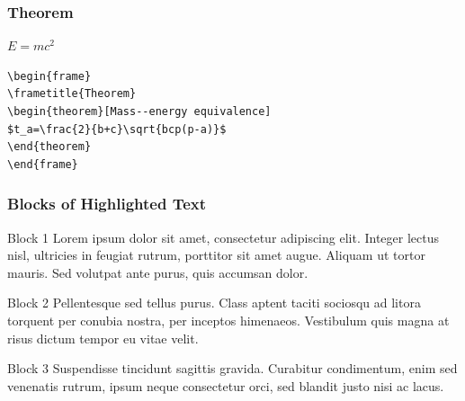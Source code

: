 \documentclass{beamer}
\begin{document}
\begin{frame}[fragile]

\frametitle{Theorem}
\begin{theorem}
$E = mc^2$
\end{theorem}

\begin{example}
\begin{verbatim}
\begin{frame}
\frametitle{Theorem}
\begin{theorem}[Mass--energy equivalence]
$t_a=\frac{2}{b+c}\sqrt{bcp(p-a)}$
\end{theorem}
\end{frame}\end{verbatim}
\end{example}


\end{frame}



\begin{frame}
\frametitle{Blocks of Highlighted Text}
\begin{block}{Block 1}
Lorem ipsum dolor sit amet, consectetur adipiscing elit. Integer lectus nisl, ultricies in feugiat rutrum, porttitor sit amet augue. Aliquam ut tortor mauris. Sed volutpat ante purus, quis accumsan dolor.
\end{block}

\begin{block}{Block 2}
Pellentesque sed tellus purus. Class aptent taciti sociosqu ad litora torquent per conubia nostra, per inceptos himenaeos. Vestibulum quis magna at risus dictum tempor eu vitae velit.
\end{block}

\begin{block}{Block 3}
Suspendisse tincidunt sagittis gravida. Curabitur condimentum, enim sed venenatis rutrum, ipsum neque consectetur orci, sed blandit justo nisi ac lacus.
\end{block}
\end{frame}



\end{document}

